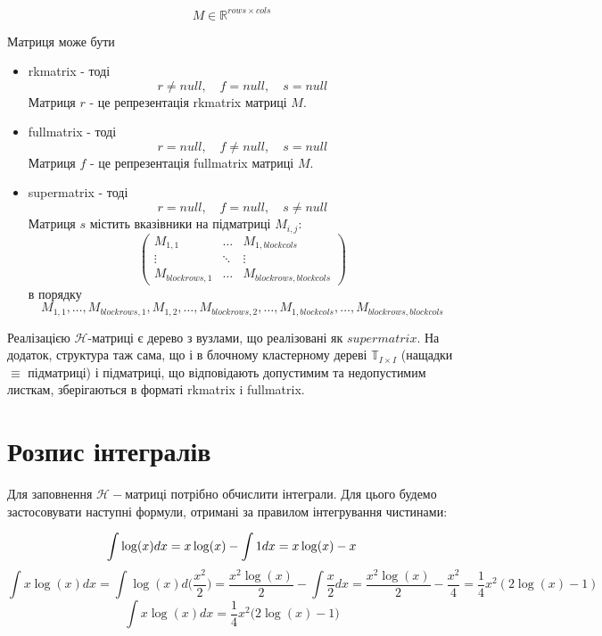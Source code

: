 \documentclass[12pt]{report}
\begin{document}
	$$M\in\mathbb{R}^{rows\times cols}$$
	\par Матриця може бути 
	\begin{itemize}
		\item rkmatrix - тоді 
		$$r\not=null,\quad
		f=null,\quad
		s=null$$
		Матриця $r$ - це репрезентація rkmatrix матриці $M$.
		\item fullmatrix - тоді  
		$$r=null,\quad
		f\not=null,\quad
		s=null$$
		Матриця $f$ - це репрезентація fullmatrix матриці $M$.
		\item supermatrix - тоді
		$$r=null,\quad
		f=null,\quad
		s\not=null$$
		Матриця $s$ містить вказівники на підматриці $M_{i,j}$:
		\[
			\begin{pmatrix}
				M_{1,1} & \dots & M_{1,blockcols}\\
				\vdots & \ddots & \vdots \\
				M_{blockrows,1} &\dots  & M_{blockrows,blockcols}
			\end{pmatrix}
		\]
		в порядку 
		$$M_{1,1},\dots,M_{blockrows,1},M_{1,2},\dots,M_{blockrows,2},\dots,M_{1,blockcols},\dots,M_{blockrows,blockcols}$$
	\end{itemize}
	\par Реалізацією $\mathcal{H}$-матриці є дерево з вузлами, що реалізовані як $supermatrix$. На додаток, структура таж сама, що і в блочному кластерному дереві $\mathbb{T}_{I\times I}$ (нащадки $\equiv$ підматриці) і підматриці, що відповідають допустимим та недопустимим листкам, зберігаються в форматі rkmatrix i fullmatrix.
	\section{Розпис інтегралів}
	\hspace{0.8cm}Для заповнення $\mathcal{H}-$матриці потрібно обчислити інтеграли. Для цього будемо застосовувати наступні формули, отримані за правилом інтегрування чистинами:
	
	\begin{equation}
		\int \log(x) dx = x\log(x)-\int 1 dx = x\log(x)-x\\
	\end{equation}
	$$\int x\log(x)dx=\int\log(x)d\Big(\frac{x^2}{2}\Big)=\frac{x^2\log(x)}{2}-\int \frac{x}{2}dx=\frac{x^2\log(x)}{2}-\frac{x^2}{4}=\frac{1}{4}x^2(2\log(x)-1)$$
	\begin{equation}
	\int x\log(x)dx=\frac{1}{4}x^2\big(2\log(x)-1\big)
	\end{equation}
\end{document}
